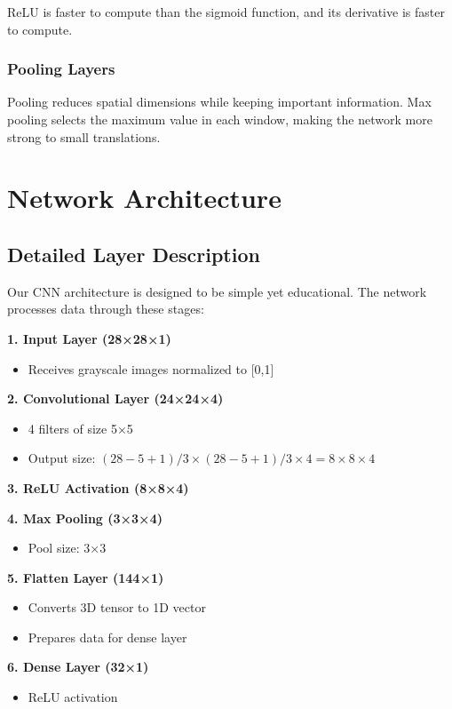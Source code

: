 \documentclass[conference]{IEEEtran}
\begin{document}
ReLU is faster to compute than the sigmoid function, and its derivative is faster to compute.

\subsubsection{Pooling Layers}
Pooling reduces spatial dimensions while keeping important information. Max pooling selects the maximum value in each window, making the network more strong to small translations.

\section{Network Architecture}

\subsection{Detailed Layer Description}
Our CNN architecture is designed to be simple yet educational. The network processes data through these stages:

\textbf{1. Input Layer (28×28×1)}
\begin{itemize}
    \item Receives grayscale images normalized to [0,1]
\end{itemize}

\textbf{2. Convolutional Layer (24×24×4)}
\begin{itemize}
    \item 4 filters of size 5×5
    \item Output size: $(28-5+1)/3 \times (28-5+1)/3 \times 4 = 8 \times 8 \times 4$
\end{itemize}

\textbf{3. ReLU Activation (8×8×4)}

\textbf{4. Max Pooling (3×3×4)}
\begin{itemize}
    \item Pool size: 3×3
\end{itemize}

\textbf{5. Flatten Layer (144×1)}
\begin{itemize}
    \item Converts 3D tensor to 1D vector
    \item Prepares data for dense layer
\end{itemize}

\textbf{6. Dense Layer (32×1)}
\begin{itemize}
    \item ReLU activation
\end{itemize}
\end{document}
